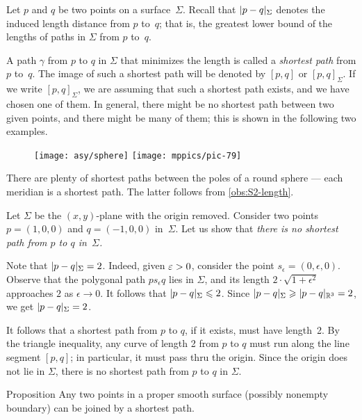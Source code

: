 Let $p$ and $q$ be two points on a surface~$\Sigma$.
Recall that $\dist{p}{q}\Sigma$ denotes the induced length distance from $p$ to~$q$;
that is, the greatest lower bound of the lengths of paths in $\Sigma$ from $p$ to~$q$.


A path $\gamma$ from $p$ to $q$ in $\Sigma$ that minimizes the length is called a \emph{shortest path} from $p$ to~$q$.
The image of such a shortest path will be denoted by $[p,q]$ or $[p,q]_\Sigma$.
If we write $[p,q]_\Sigma$, we are assuming that such a shortest path exists, and we have chosen one of them.
In general, there might be no shortest path between two given points, and there might be many of them;
this is shown in the following two examples.


{

\begin{wrapfigure}[9]{r}{28 mm}
\vskip-6mm
\centering
\texttt{[image: asy/sphere]}
\bigskip
\texttt{[image: mppics/pic-79]}
\end{wrapfigure}

 There are plenty of shortest paths between the poles of a round sphere --- each meridian is a shortest path.
The latter follows from \ref{obs:S2-length}.

 Let $\Sigma$ be the $(x,y)$-plane with the origin removed.
Consider two points $p=(1,0,0)$ and $q=(-1,0,0)$ in~$\Sigma$.
Let us show that \textit{there is no shortest path from $p$ to $q$ in~$\Sigma$.}

Note that $\dist{p}{q}\Sigma=2$. 
Indeed, given $\epsilon\z>0$, consider the point $s_\epsilon=(0,\epsilon,0)$.
Observe that the polygonal path $ps_\epsilon q$ lies in $\Sigma$, and its length $2\cdot\sqrt{1+\epsilon^2}$ approaches $2$ as $\epsilon\to0$.
It follows that $\dist{p}{q}\Sigma\le 2$.
Since $\dist{p}{q}\Sigma\z\ge \dist{p}{q}{\mathbb{R}^3}=2$, we get $\dist{p}{q}\Sigma=2$.

It follows that a shortest path from $p$ to $q$, if it exists, must have length~2.
By the triangle inequality, any curve of length 2 from $p$ to $q$ must run along the line segment $[p,q]$;
in particular, it must pass thru the origin.
Since the origin does not lie in $\Sigma$, there is no shortest path from $p$ to $q$ in $\Sigma$. 


\begin{thm}{Proposition}\label{prop:shortest-paths-exist}
Any two points in a proper smooth surface (possibly nonempty boundary) can be joined by a shortest path. 
\end{thm}

}
